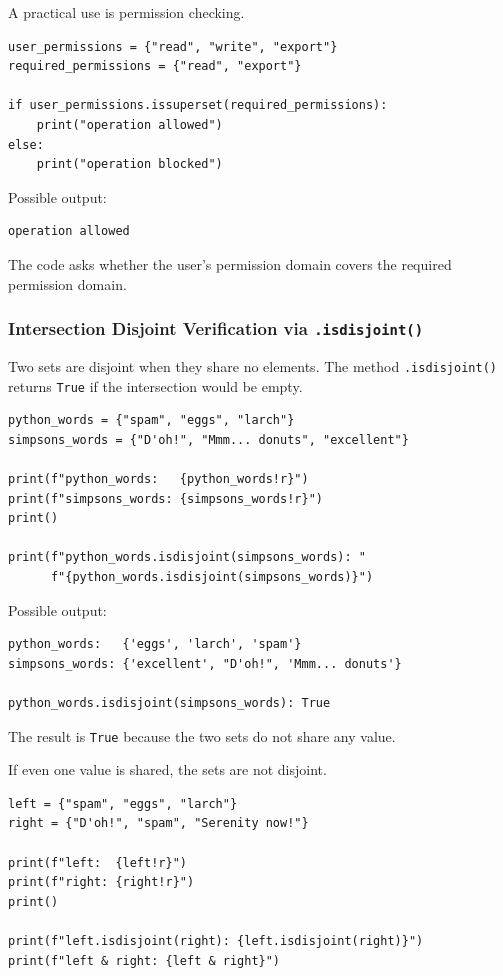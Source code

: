 A practical use is permission checking.

\begin{verbatim}
user_permissions = {"read", "write", "export"}
required_permissions = {"read", "export"}

if user_permissions.issuperset(required_permissions):
    print("operation allowed")
else:
    print("operation blocked")
\end{verbatim}

Possible output:

\begin{verbatim}
operation allowed
\end{verbatim}

The code asks whether the user's permission domain covers the required permission domain.

\subsubsection{Intersection Disjoint Verification via \texttt{.isdisjoint()}}

Two sets are disjoint when they share no elements. The method \texttt{.isdisjoint()} returns \texttt{True} if the intersection would be empty.

\begin{verbatim}
python_words = {"spam", "eggs", "larch"}
simpsons_words = {"D'oh!", "Mmm... donuts", "excellent"}

print(f"python_words:   {python_words!r}")
print(f"simpsons_words: {simpsons_words!r}")
print()

print(f"python_words.isdisjoint(simpsons_words): "
      f"{python_words.isdisjoint(simpsons_words)}")
\end{verbatim}

Possible output:

\begin{verbatim}
python_words:   {'eggs', 'larch', 'spam'}
simpsons_words: {'excellent', "D'oh!", 'Mmm... donuts'}

python_words.isdisjoint(simpsons_words): True
\end{verbatim}

The result is \texttt{True} because the two sets do not share any value.

If even one value is shared, the sets are not disjoint.

\begin{verbatim}
left = {"spam", "eggs", "larch"}
right = {"D'oh!", "spam", "Serenity now!"}

print(f"left:  {left!r}")
print(f"right: {right!r}")
print()

print(f"left.isdisjoint(right): {left.isdisjoint(right)}")
print(f"left & right: {left & right}")
\end{verbatim}

